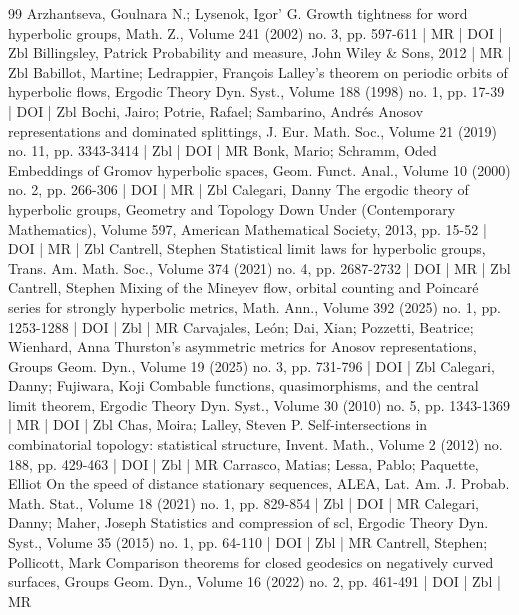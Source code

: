 \documentclass[10pt]{amsart}
\theoremstyle{definition}\newtheorem{defi}[theo]{Definition}\newtheorem{rema}[theo]{Remark}\newtheorem{exam}[theo]{Example}\newtheorem{exem}[theo]{Example}\newtheorem{nota}[theo]{Notation}
\theoremstyle{plain}
\begin{document}
\begin{thebibliography}{99}
 Arzhantseva, Goulnara N.; Lysenok, Igor’ G. Growth tightness for word hyperbolic groups, Math. Z., Volume 241 (2002) no. 3, pp. 597-611 | MR | DOI | Zbl
 Billingsley, Patrick Probability and measure, John Wiley \& Sons, 2012 | MR | Zbl
 Babillot, Martine; Ledrappier, François Lalley’s theorem on periodic orbits of hyperbolic flows, Ergodic Theory Dyn. Syst., Volume 188 (1998) no. 1, pp. 17-39 | DOI | Zbl
 Bochi, Jairo; Potrie, Rafael; Sambarino, Andrés Anosov representations and dominated splittings, J. Eur. Math. Soc., Volume 21 (2019) no. 11, pp. 3343-3414 | Zbl | DOI | MR
 Bonk, Mario; Schramm, Oded Embeddings of Gromov hyperbolic spaces, Geom. Funct. Anal., Volume 10 (2000) no. 2, pp. 266-306 | DOI | MR | Zbl
 Calegari, Danny The ergodic theory of hyperbolic groups, Geometry and Topology Down Under (Contemporary Mathematics), Volume 597, American Mathematical Society, 2013, pp. 15-52 | DOI | MR | Zbl
 Cantrell, Stephen Statistical limit laws for hyperbolic groups, Trans. Am. Math. Soc., Volume 374 (2021) no. 4, pp. 2687-2732 | DOI | MR | Zbl
 Cantrell, Stephen Mixing of the Mineyev flow, orbital counting and Poincaré series for strongly hyperbolic metrics, Math. Ann., Volume 392 (2025) no. 1, pp. 1253-1288 | DOI | Zbl | MR
 Carvajales, León; Dai, Xian; Pozzetti, Beatrice; Wienhard, Anna Thurston’s asymmetric metrics for Anosov representations, Groups Geom. Dyn., Volume 19 (2025) no. 3, pp. 731-796 | DOI | Zbl
 Calegari, Danny; Fujiwara, Koji Combable functions, quasimorphisms, and the central limit theorem, Ergodic Theory Dyn. Syst., Volume 30 (2010) no. 5, pp. 1343-1369 | MR | DOI | Zbl
 Chas, Moira; Lalley, Steven P. Self-intersections in combinatorial topology: statistical structure, Invent. Math., Volume 2 (2012) no. 188, pp. 429-463 | DOI | Zbl | MR
 Carrasco, Matias; Lessa, Pablo; Paquette, Elliot On the speed of distance stationary sequences, ALEA, Lat. Am. J. Probab. Math. Stat., Volume 18 (2021) no. 1, pp. 829-854 | Zbl | DOI | MR
 Calegari, Danny; Maher, Joseph Statistics and compression of scl, Ergodic Theory Dyn. Syst., Volume 35 (2015) no. 1, pp. 64-110 | DOI | Zbl | MR
 Cantrell, Stephen; Pollicott, Mark Comparison theorems for closed geodesics on negatively curved surfaces, Groups Geom. Dyn., Volume 16 (2022) no. 2, pp. 461-491 | DOI | Zbl | MR

\end{thebibliography}
\end{document}
